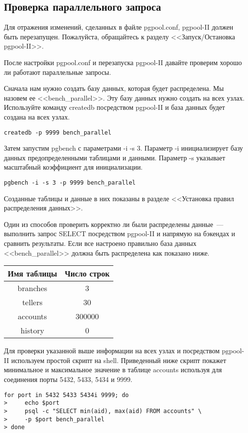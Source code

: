 \subsection{Проверка параллельного запроса}
Для отражения изменений, сделанных в файле pgpool.conf, pgpool-II должен быть перезапущен.
Пожалуйста, обращайтесь к разделу <<Запуск/Остановка pgpool-II>>.

После настройки pgpool.conf и перезапуска pgpool-II давайте проверим хорошо ли работают параллельные запросы.

Сначала нам нужно создать базу данных, которая будет распределена. Мы назовем ее <<bench\_parallel>>.
Эту базу данных нужно создать на всех узлах. Используйте команду createdb посредством pgpool-II и база
данных будет создана на всех узлах.
\begin{lstlisting}[label=lst:pgpool37,caption=Проверка параллельного запроса]
createdb -p 9999 bench_parallel
\end{lstlisting}

Затем запустим pgbench с параметрами -i -s 3. Параметр -i инициализирует базу данных предопределенными
таблицами и данными. Параметр -s указывает масштабный коэффициент для инициализации.
\begin{lstlisting}[label=lst:pgpool38,caption=Проверка параллельного запроса]
pgbench -i -s 3 -p 9999 bench_parallel
\end{lstlisting}

Созданные таблицы и данные в них показаны в разделе <<Установка правил распределения данных>>.

Один из способов проверить корректно ли были распределены данные~--- выполнить запрос SELECT посредством
pgpool-II и напрямую на бэкендах и сравнить результаты. Если все настроено правильно база данных
<<bench\_parallel>> должна быть распределена как показано ниже.

\begin{tabular}{ | c | c | }
  \hline
  Имя таблицы & Число строк \\
  \hline
  branches & 3 \\
  \hline
  tellers & 30 \\
  \hline
  accounts & 300000 \\
  \hline
  history & 0 \\
  \hline
\end{tabular}

Для проверки указанной выше информации на всех узлах и посредством pgpool-II используем простой скрипт на shell.
Приведенный ниже скрипт покажет минимальное и максимальное значение в таблице accounts используя для соединения
порты 5432, 5433, 5434 и 9999.
\begin{lstlisting}[label=lst:pgpool39,caption=Проверка параллельного запроса]
for port in 5432 5433 5434i 9999; do
>     echo $port
>     psql -c "SELECT min(aid), max(aid) FROM accounts" \
>     -p $port bench_parallel
> done
\end{lstlisting}


